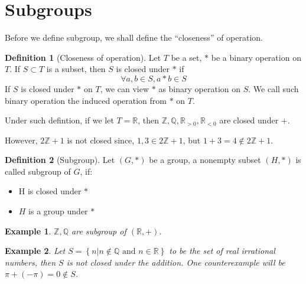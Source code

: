 \documentclass{article}
\theoremstyle{MyNonumberplain}
\theoremstyle{break}
\theoremstyle{break}
\newtheorem{example}{Example}[section]
\theoremstyle{break}
\theoremstyle{definition}
\theoremstyle{break}
\newtheorem{definition}{Definition}[section]
\begin{document}
\newpage

\section{Subgroups}

Before we define subgroup, we shall define the ``closeness'' of operation.

\begin{defbox}
    \begin{definition}[Closeness of operation]
        Let $T$ be a set, $*$ be a binary operation on $T$. If $S\subset T$ is a subset, then $S$ is closed under $*$ if 
        $$\forall a,b\in S, a*b\in S$$
        If $S$ is closed under $\ast$ on $T$, we can view $\ast$ as binary operation on $S$. We call such binary operation the induced operation from $\ast$ on
$T$.
    \end{definition}
\end{defbox}

Under such defintion, if we let $T =\mathbb{R}$, then $\mathbb{Z}, \mathbb{Q},
\mathbb{R}_{> 0}, \mathbb{R}_{< 0}$ are closed under +.

However, $2\mathbb{Z}+ 1$ is not closed since, $1, 3 \in 2\mathbb{Z}+ 1$, but $1 + 3 = 4 \not\in 2\mathbb{Z}+ 1$.

\begin{defbox}
    \begin{definition}[Subgroup]
        Let $(G, \ast)$ be a group, a nonempty subset $(H, \ast)$ is called
        subgroup of $G$, if: \bigskip
        \begin{itemize}
          \item H is closed under $\ast$\bigskip
          
          \item $H$ is a group under $\ast$
        \end{itemize}
    \end{definition}
\end{defbox}

\begin{expbox}
    \begin{example}
        $\mathbb{Z}, \mathbb{Q}$ are subgroup of $(\mathbb{R}, +)$.
    \end{example}
\end{expbox}

\begin{expbox}
    \begin{example}
        Let $S = \left\{ n|n \not\in \mathbb{Q} \text{ and } n \in \mathbb{R}
\right\}$ to be the set of real irrational numbers, then $S$ is not closed
under the addition. One counterexample will be $\pi + (- \pi) = 0 \not\in
S$.
    \end{example}
\end{expbox}
\end{document}
